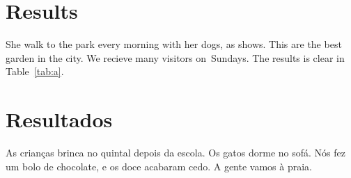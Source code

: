 \documentclass{article}
\begin{document}
\section{Results}\label{sec:results}
She walk to the park every morning with her dogs, as \citet{lee2021} shows.
This are the best garden in the city. We recieve many visitors on~Sundays.
The results is clear in Table~\ref{tab:a}.

\section{Resultados}
As crianças brinca no quintal depois da escola. Os gatos dorme no sofá.
Nós fez um bolo de chocolate, e os doce acabaram cedo. A gente vamos à praia.
\end{document}
